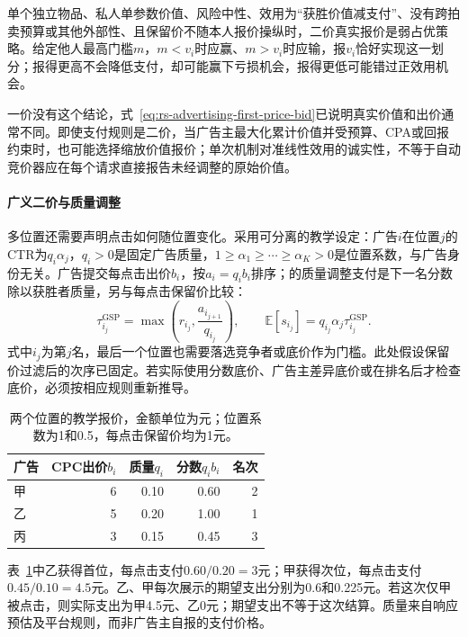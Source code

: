单个独立物品、私人单参数价值、风险中性、效用为“获胜价值减支付”、没有跨拍卖预算或其他外部性、且保留价不随本人报价操纵时，二价真实报价是弱占优策略。给定他人最高门槛$m$，$m<v_i$时应赢、$m>v_i$时应输，报$v_i$恰好实现这一划分；报得更高不会降低支付，却可能赢下亏损机会，报得更低可能错过正效用机会。

一价没有这个结论，式~\eqref{eq:rs-advertising-first-price-bid}已说明真实价值和出价通常不同。即使支付规则是二价，当广告主最大化累计价值并受预算、CPA或回报约束时，也可能选择缩放价值报价；单次机制对准线性效用的诚实性，不等于自动竞价器应在每个请求直接报告未经调整的原始价值。

\paragraph{广义二价与质量调整}
\label{sec:rs-advertising-gsp}

多位置还需要声明点击如何随位置变化。采用可分离的教学设定：广告$i$在位置$j$的CTR为$q_i\alpha_j$，$q_i>0$是固定广告质量，$1\geq\alpha_1\geq\cdots\geq\alpha_K>0$是位置系数，与广告身份无关。广告提交每点击出价$b_i$，按$a_i=q_ib_i$排序；的质量调整支付是下一名分数除以获胜者质量，另与每点击保留价比较：
\begin{equation}
  \tau_{i_j}^{\mathrm{GSP}}
   =\max\!\left(r_{i_j},\frac{a_{i_{j+1}}}{q_{i_j}}\right),
  \qquad
  \mathbb{E}[s_{i_j}]=q_{i_j}\alpha_j\tau_{i_j}^{\mathrm{GSP}}.
  \label{eq:rs-advertising-gsp}
\end{equation}
式中$i_j$为第$j$名，最后一个位置也需要落选竞争者或底价作为门槛。此处假设保留价过滤后的次序已固定。若实际使用分数底价、广告主差异底价或在排名后才检查底价，必须按相应规则重新推导。

\begin{table}[htbp]
  \centering
  \begin{tabular}{@{}lrrrr@{}}
    \toprule
    广告 & CPC出价$b_i$ & 质量$q_i$ & 分数$q_ib_i$ & 名次\\
    \midrule
    甲 & 6 & 0.10 & 0.60 & 2\\
    乙 & 5 & 0.20 & 1.00 & 1\\
    丙 & 3 & 0.15 & 0.45 & 3\\
    \bottomrule
  \end{tabular}
  \caption{两个位置的教学报价，金额单位为元；位置系数为1和0.5，每点击保留价均为1元。}
  \label{tab:rs-advertising-gsp}
\end{table}

表~\ref{tab:rs-advertising-gsp}中乙获得首位，每点击支付$0.60/0.20=3$元；甲获得次位，每点击支付$0.45/0.10=4.5$元。乙、甲每次展示的期望支出分别为0.6和0.225元。若这次仅甲被点击，则实际支出为甲4.5元、乙0元；期望支出不等于这次结算。质量来自响应预估及平台规则，而非广告主自报的支付价格。

